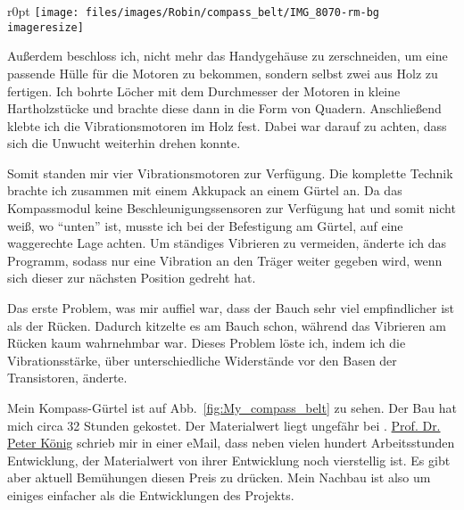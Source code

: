 \begin{wrapfigure}{r}{0pt}
	\texttt{[image: files/images/Robin/compass\_belt/IMG\_8070-rm-bg\\imageresize]}
	\label{fig:motors_compass_belt}
\end{wrapfigure}
Außerdem beschloss ich,
nicht mehr das Handygehäuse zu zerschneiden, um eine passende Hülle für die
Motoren zu bekommen, sondern selbst zwei aus Holz zu fertigen. Ich bohrte Löcher mit dem Durchmesser
der
Motoren in kleine Hartholzstücke und brachte diese dann in die Form von Quadern. Anschließend klebte ich
die Vibrationsmotoren im Holz fest. Dabei war darauf zu achten, dass sich die Unwucht weiterhin drehen
konnte.

Somit standen mir vier Vibrationsmotoren zur Verfügung.
Die komplette Technik brachte ich zusammen mit einem Akkupack
an einem Gürtel an. Da das Kompassmodul keine Beschleunigungssensoren zur Verfügung hat und somit
nicht weiß, wo \enquote{unten} ist, musste ich bei der Befestigung am Gürtel, auf eine waggerechte
Lage achten. Um ständiges Vibrieren zu vermeiden, änderte ich das Programm, sodass
nur eine Vibration an den Träger weiter gegeben wird, wenn sich dieser zur nächsten Position gedreht
hat.

Das erste Problem, was mir auffiel war, dass der Bauch sehr viel empfindlicher ist als der Rücken.
Dadurch kitzelte es am Bauch schon, während das Vibrieren am Rücken kaum wahrnehmbar war. Dieses
Problem löste ich, indem ich die Vibrationsstärke, über unterschiedliche Widerstände
vor den Basen der Transistoren, änderte.

Mein Kompass-Gürtel ist auf Abb.~\vref{fig:My_compass_belt} zu sehen. Der Bau hat mich circa 32
Stunden gekostet. Der Materialwert liegt ungefähr bei .
\href{http://www.cogsci.uni-osnabrueck.de/NBP/peterhome.html}%
{Prof. Dr. Peter König} schrieb mir
in einer eMail, dass neben vielen hundert Arbeitsstunden Entwicklung, der Materialwert
von ihrer Entwicklung noch vierstellig ist.
Es gibt aber aktuell Bemühungen diesen Preis zu drücken.
Mein Nachbau ist also um einiges einfacher als die Entwicklungen des \Linkfeelspace{} Projekts.

